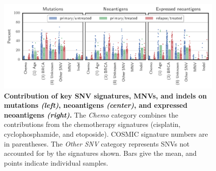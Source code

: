 \begin{figure}[htbp]
\centering
\includegraphics[scale=1.0]{figures/sources_of_mutations_and_neoantigens.pdf}
\caption{\textbf{Contribution of key SNV signatures, MNVs, and indels on mutations \textit{(left)}, neoantigens \textit{(center)}, and expressed neoantigens \textit{(right)}.} The \textit{Chemo} category combines the contributions from the chemotherapy signatures (cisplatin, cyclophosphamide, and etoposide). COSMIC signature numbers are in parentheses. The \textit{Other SNV} category represents SNVs not accounted for by the signatures shown. Bars give the mean, and points indicate individual samples.}
\label{fig:sources}
\end{figure}
